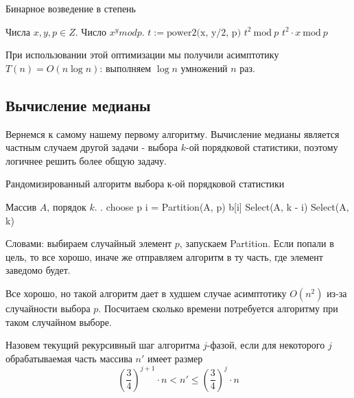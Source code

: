 		\begin{algorithm}[H]
			\caption{Бинарное возведение в степень}
			\begin{algorithmic}[1]
				\Require Числа $x, y, p\in Z$.
				\Ensure Число $x^y mod p$.
						\State {}
					\Else
						\State $t := \text{power2(x, y/2, p)}$
							\State \Return $t^2 \ \text{mod} \ p$
						\Else
							\State \Return $t^2 \cdot x \ \text{mod} \ p$
						\EndIf
					\EndIf
				\EndFunction
			\end{algorithmic}
		\end{algorithm}
		
		\begin{time}
			При использовании этой оптимизации мы получили асимптотику $T(n) = O(n\log n)$: выполняем $\log n$ умножений $n$ раз.
		\end{time}
		
		\subsection{Вычисление медианы}
		
		Вернемся к самому нашему первому алгоритму. Вычисление медианы является частным случаем другой задачи - выбора $k$-ой порядковой статистики, поэтому логичнее решить более общую задачу.
		
		\begin{algorithm}[H]
			\caption{Рандомизированный алгоритм выбора к-ой порядковой статистики}
			\begin{algorithmic}[1]
				\Require Массив $A$, порядок $k$.
				\Ensure .
					\State choose p
					\State i = Partition(A, p)
						\State \Return b[i]
						\State \Return Select(A, k - i)
					\Else
						\State \Return Select(A, k)
					\EndIf
				\EndFunction
			\end{algorithmic}
		\end{algorithm}
		
		Словами: выбираем случайный элемент $p$, запускаем Partition. Если попали в цель, то все хорошо, иначе же отправляем алгоритм в ту часть, где элемент заведомо будет.
		
		Все хорошо, но такой алгоритм дает в худшем случае асимптотику $O(n^2)$ из-за случайности выбора $p$. Посчитаем сколько времени потребуется алгоритму при таком случайном выборе.
		
		\begin{definition}
			Назовем текущий рекурсивный шаг алгоритма $j$-фазой, если для некоторого $j$ обрабатываемая часть массива $n'$ имеет размер
			\[
			\left(\frac{3}{4}\right)^{j + 1} \cdot n < n' \leqslant \left(\frac{3}{4}\right)^{j} \cdot n
			\]
		\end{definition}
		
